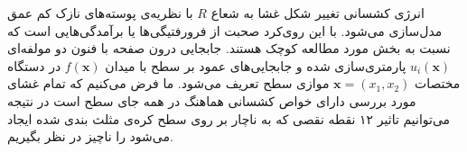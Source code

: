 انرژی کشسانی تغییر شکل غشا به شعاع
 $R$ 
با نظریه‌ی پوسته‌های نازک کم عمق مدل‌سازی می‌شود. با این روی‌کرد صحبت از فرورفتیگی‌ها یا برآمدگی‌هایی است که نسبت به بخش مورد مطالعه کوچک هستند. جابجایی درون صفحه با فنون دو مولفه‌ای 
$u_i(\boldsymbol{x})$ 
پارمتری‌سازی شده و جابجایی‌های عمود بر سطح با میدان 
$f(\boldsymbol{x})$
در دستگاه مختصات
$\boldsymbol{x}=(x_1,x_2)$
موازی سطح تعریف می‌‌شود. ما فرض می‌کنیم که تمام غشای مورد بررسی دارای خواص کشسانی هماهنگ در همه جای سطح است در نتیجه می‌توانیم تاثیر ۱۲ نقطه نقصی که به ناچار بر روی سطح کره‌ی مثلث بندی شده ایجاد می‌شود را ناچیز در نظر بگیریم.

















